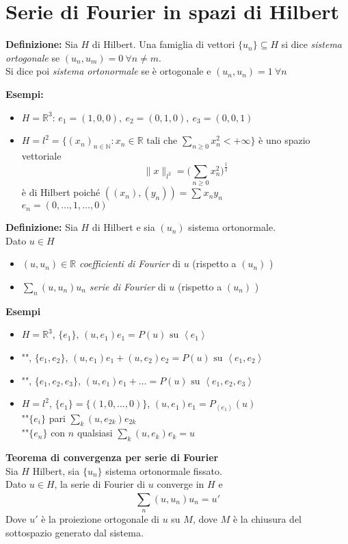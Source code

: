 \documentclass[a4paper]{article}
\newcommand{\R}{\mathbb{R}}
\newcommand{\N}{\mathbb{N}}
\begin{document}
\section{Serie di Fourier in spazi di Hilbert}
\begin{tcolorbox}
	\textbf{Definizione: }Sia $H$ di Hilbert. Una famiglia di vettori $\{u_n\} \subseteq  H$ si dice \emph{sistema ortogonale} se $(u_n,u_m)=0\ \forall n\neq m$. 
	\\Si dice poi \emph{sistema ortonormale} se è ortogonale e $(u_n,u_n)=1\ \forall n$
\end{tcolorbox}
\textbf{Esempi:} 
\begin{itemize}
	\item $H=\R^3$: $e_1=(1,0,0),\ e_2=(0,1,0),\ e_3=(0,0,1)$ 
	\item $H=l^2=\{(x_n)_{n\in \N}:x_n\in \R\text{ tali che }\sum_{n\ge 0}^{} x_n^2<+\infty\} $ è uno spazio vettoriale
		\[\|x\|_{l^2}=\bigg(\sum_{n\ge 0}^{} x_n^2 \bigg)^{\frac{1}{2}}\]
		è di Hilbert poiché $((x_n),(y_n))=\sum_{}^{} x_ny_n$ 
		\\$e_n=(0,\ldots,1,\ldots,0)$
\end{itemize}
\begin{tcolorbox}
	\textbf{Definizione: }Sia $H$ di Hilbert e sia $(u_n)$ sistema ortonormale.
	\\Dato $u\in H$ 
	\begin{itemize}
		\item $(u,u_n)\in \R$ \emph{coefficienti di Fourier} di $u$ (rispetto a $(u_n)$ )
		\item $\sum_{n}^{} (u,u_n)u_n$ \emph{serie di Fourier} di $u$ (rispetto a $(u_n)$ )
	\end{itemize}
\end{tcolorbox}
\textbf{Esempi} 
\begin{itemize}
	\item $H=\R^3$, $\{e_1\} $, $(u,e_1)e_1=P(u)\text{ su }\left< e_1 \right> $ 
	\item "", $\{e_1,e_2\} $, $(u,e_1)e_1+(u,e_2)e_2=P(u)\text{ su }\left< e_1,e_2 \right> $ 
	\item "", $\{e_1,e_2,e_3\} $, $(u,e_1)e_1+\ldots=P(u)\text{ su }\left< e_1,e_2,e_3 \right> $ 
	\item $H=l^2$, $\{e_1\} =\{(1,0,\ldots,0)\} $, $(u,e_1)e_1=P_{\left< e_1 \right> }(u)$
		\\""$\{e_i\} $ pari $\sum_{k}^{} (u,e_{2k})e_{2k}$
		\\""$\{e_n\} $ con $n$ qualsiasi $\sum_{k}^{} (u,e_k)e_k=u$ 
\end{itemize}
\begin{tcolorbox}
\textbf{Teorema di convergenza per serie di Fourier}
\\Sia $H$ Hilbert, sia $\{u_n\} $ sistema ortonormale fissato.
\\Dato $u\in H$, la serie di Fourier di $u$ converge in $H$ e 
\[\sum_{n}^{} (u,u_n)u_n=u'\]
Dove $u'$ è la proiezione ortogonale di $u$ su $M$, dove $M$ è la chiusura del sottospazio generato dal sistema.
\end{tcolorbox}
\end{document}
